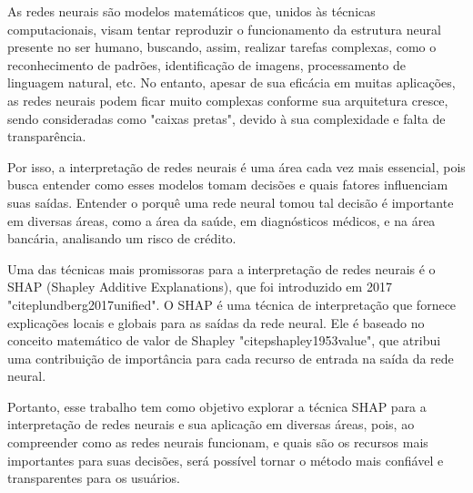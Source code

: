 As redes neurais são modelos matemáticos que, unidos às técnicas computacionais, visam tentar reproduzir
 o funcionamento da estrutura neural presente no ser humano, buscando, assim, realizar tarefas complexas,
  como o reconhecimento de padrões, identificação de imagens, processamento de linguagem natural, etc. 
  No entanto, apesar de sua eficácia em muitas aplicações, as redes neurais podem ficar muito complexas
   conforme sua arquitetura cresce, sendo consideradas como "caixas pretas", devido à sua complexidade 
   e falta de transparência. 

Por isso, a interpretação de redes neurais é uma área cada vez mais essencial, pois busca entender como
 esses modelos tomam decisões e quais fatores influenciam suas saídas. Entender o porquê uma rede 
 neural tomou tal decisão é importante em diversas áreas, como a área da saúde, em diagnósticos médicos, 
 e na área bancária, analisando um risco de crédito.

Uma das técnicas mais promissoras para a interpretação de redes neurais é o SHAP (Shapley Additive Explanations), 
que foi introduzido em 2017 "citep{lundberg2017unified}". O SHAP é uma técnica de interpretação que fornece explicações
 locais e globais para as saídas da rede neural. Ele é baseado no conceito matemático de valor de Shapley "citep{shapley1953value}",
  que atribui uma contribuição de importância para cada recurso de entrada na saída da rede neural.

Portanto, esse trabalho tem como objetivo explorar a técnica SHAP para a interpretação de redes neurais 
e sua aplicação em diversas áreas, pois, ao compreender como as redes neurais funcionam, e quais são os 
recursos mais importantes para suas decisões, será possível tornar o método mais confiável e transparentes para os usuários. 



